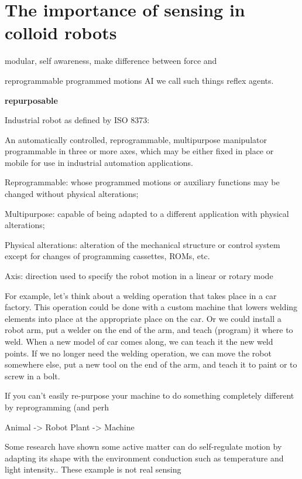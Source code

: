 \section{The importance of  sensing in colloid robots}
modular, self awareness, make difference between force and 

reprogrammable 
 programmed motions
  AI we call such things reflex agents. 
  
  \textbf{repurposable}
  
  Industrial robot as defined by ISO 8373:

An automatically controlled, reprogrammable, multipurpose manipulator programmable in three or more axes, which may be either fixed in place or mobile for use in industrial automation applications.

Reprogrammable: whose programmed motions or auxiliary functions may be changed without physical alterations;

Multipurpose: capable of being adapted to a different application with physical alterations;

Physical alterations: alteration of the mechanical structure or control system except for changes of programming cassettes, ROMs, etc.

Axis: direction used to specify the robot motion in a linear or rotary mode

For example, let's think about a welding operation that takes place in a car factory. This operation could be done with a custom machine that lowers welding elements into place at the appropriate place on the car. Or we could install a robot arm, put a welder on the end of the arm, and teach (program) it where to weld. When a new model of car comes along, we can teach it the new weld points. If we no longer need the welding operation, we can move the robot somewhere else, put a new tool on the end of the arm, and teach it to paint or to screw in a bolt.

 If you can't easily re-purpose your machine to do something completely different by reprogramming (and perh
 
 Animal -> Robot
Plant -> Machine

Some research have shown some active matter can do self-regulate motion by adapting its shape with the environment conduction such as temperature and light intensity.\cite{tu2017self,li2018light}. These example is not real sensing
